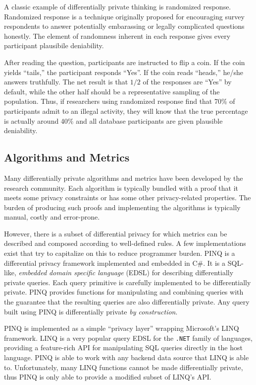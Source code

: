 \documentclass[12pt]{report}
\begin{document}
A classic example of differentially private thinking is randomized response.
Randomized response is a technique originally proposed for encouraging survey respondents to answer potentially embarassing or legally complicated questions honestly\cite{warner1965randomized}.
The element of randomness inherent in each response gives every participant plausibile deniability.

After reading the question, participants are instructed to flip a coin.
If the coin yields ``tails,'' the participant responds ``Yes''.
If the coin reads ``heads,'' he/she answers truthfully.
The net result is that $1/2$ of the responses are ``Yes'' by default, while the other half should be a representative sampling of the population.
Thus, if researchers using randomized response find that 70\% of participants admit to an illegal activity, they will know that the true percentage is actually around 40\% and all database participants are given plausible deniability.

\subsection{Algorithms and Metrics}

Many differentially private algorithms and metrics have been developed by the research community.
Each algorithm is typically bundled with a proof that it meets some privacy constraints or has some other privacy-related properties.
The burden of producing such proofs and implementing the algorithms is typically manual, costly and error-prone.

However, there is a subset of differential privacy for which metrics can be described and composed according to well-defined rules.
A few implementations exist that try to capitalize on this to reduce programmer burden.
PINQ\cite{mcsherry2010privacy} is a differential privacy framework implemented and embedded in C\#.
It is a SQL-like, \textit{embedded domain specific language} (EDSL) for describing differentially private queries.
Each query primitive is carefully implemented to be differentially private.
PINQ provides functions for manipulating and combining queries with the guarantee that the resulting queries are also differentially private.
Any query built using PINQ is differentially private \textit{by construction}.

PINQ is implemented as a simple ``privacy layer'' wrapping Microsoft's LINQ framework.
LINQ is a very popular query EDSL for the \texttt{.NET} family of languages, providing a feature-rich API for manipulating SQL queries directly in the host language.
PINQ is able to work with any backend data source that LINQ is able to.
Unfortunately, many LINQ functions cannot be made differentially private, thus PINQ is only able to provide a modified subset of LINQ's API.
\end{document}
